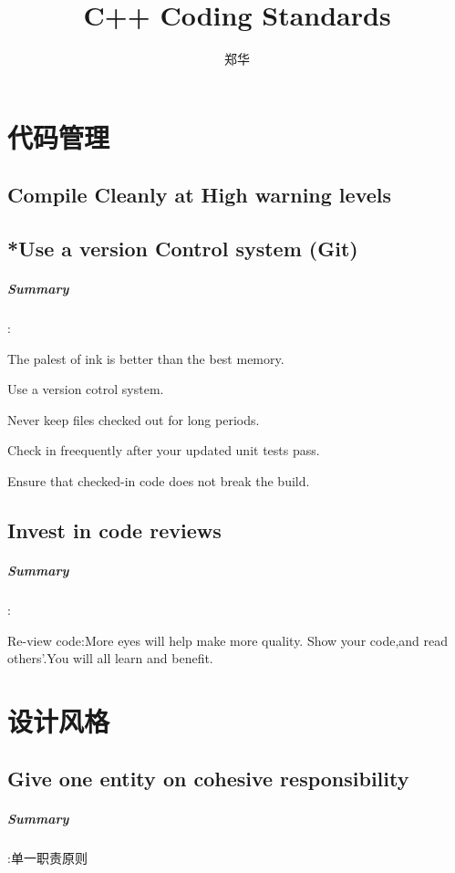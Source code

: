 \documentclass[UTF8,a4paper,12pt]{ctexbook}
\author{\kaishu 郑华}
\title{\textbf{C++ Coding Standards}}
\begin{document}
 	\maketitle
	\tableofcontents
\chapter{代码管理}
	 \section{Compile Cleanly at High warning levels}
	 \section{*Use a version Control system (Git)}
		 \paragraph{Summary}:
		 
			 The palest of ink is better than the best memory.
			 
			 Use a version cotrol system. 
			 
			 Never keep files checked out for long periods. 
			 
			 Check in freequently after your updated unit tests pass. 
			 
			 Ensure that checked-in code does not break the build.
	 \section{Invest in code reviews}
		 \paragraph{Summary}:
		 
			 Re-view code:More eyes will help make more quality. Show your code,and read others'.You will all learn and benefit.
		 

\chapter{设计风格}
	\section{Give one entity on cohesive responsibility}
		\paragraph{Summary}:单一职责原则
		
\end{document}
